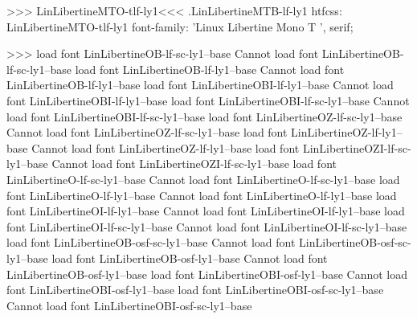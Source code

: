 >>>
\<LinLibertineMTO-tlf-ly1\><<<
.LinLibertineMTB-lf-ly1
htfcss:  LinLibertineMTO-tlf-ly1  font-family: 'Linux Libertine Mono T ', serif;

>>>
load font	LinLibertineOB-lf-sc-ly1--base
Cannot load font LinLibertineOB-lf-sc-ly1--base
load font	LinLibertineOB-lf-ly1--base
Cannot load font LinLibertineOB-lf-ly1--base
load font	LinLibertineOBI-lf-ly1--base
Cannot load font LinLibertineOBI-lf-ly1--base
load font	LinLibertineOBI-lf-sc-ly1--base
Cannot load font LinLibertineOBI-lf-sc-ly1--base
load font	LinLibertineOZ-lf-sc-ly1--base
Cannot load font LinLibertineOZ-lf-sc-ly1--base
load font	LinLibertineOZ-lf-ly1--base
Cannot load font LinLibertineOZ-lf-ly1--base
load font	LinLibertineOZI-lf-sc-ly1--base
Cannot load font LinLibertineOZI-lf-sc-ly1--base
load font	LinLibertineO-lf-sc-ly1--base
Cannot load font LinLibertineO-lf-sc-ly1--base
load font	LinLibertineO-lf-ly1--base
Cannot load font LinLibertineO-lf-ly1--base
load font	LinLibertineOI-lf-ly1--base
Cannot load font LinLibertineOI-lf-ly1--base
load font	LinLibertineOI-lf-sc-ly1--base
Cannot load font LinLibertineOI-lf-sc-ly1--base
load font	LinLibertineOB-osf-sc-ly1--base
Cannot load font LinLibertineOB-osf-sc-ly1--base
load font	LinLibertineOB-osf-ly1--base
Cannot load font LinLibertineOB-osf-ly1--base
load font	LinLibertineOBI-osf-ly1--base
Cannot load font LinLibertineOBI-osf-ly1--base
load font	LinLibertineOBI-osf-sc-ly1--base
Cannot load font LinLibertineOBI-osf-sc-ly1--base

